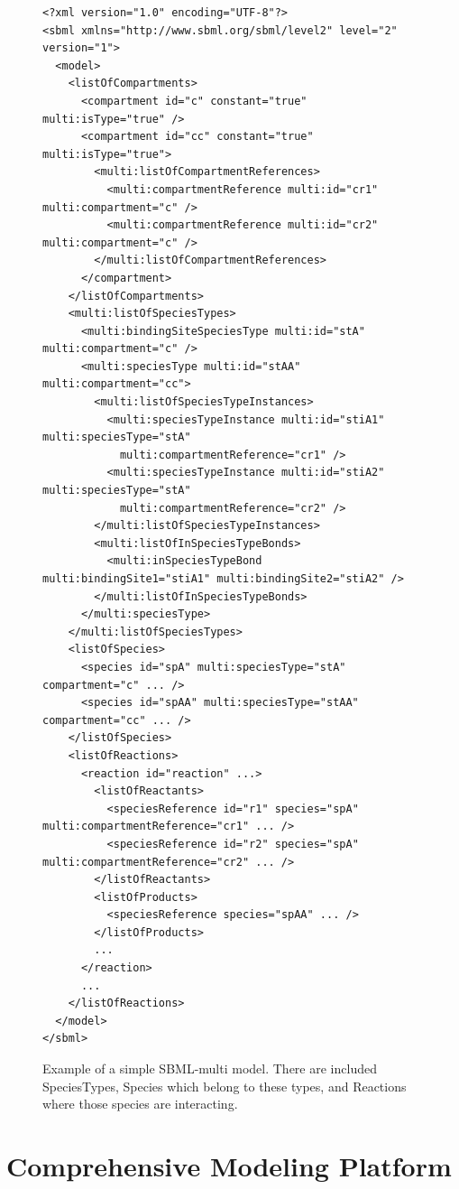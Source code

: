 \documentclass[12pt]{fithesis2}
\begin{document}
\begin{figure}[!h]
\lstset{language=XML}
\begin{lstlisting}[basicstyle=\tiny, frame=single]
<?xml version="1.0" encoding="UTF-8"?>
<sbml xmlns="http://www.sbml.org/sbml/level2" level="2" version="1">
  <model>
    <listOfCompartments>
      <compartment id="c" constant="true" multi:isType="true" />
      <compartment id="cc" constant="true" multi:isType="true">
        <multi:listOfCompartmentReferences>
          <multi:compartmentReference multi:id="cr1" multi:compartment="c" />
          <multi:compartmentReference multi:id="cr2" multi:compartment="c" />
        </multi:listOfCompartmentReferences>
      </compartment>
    </listOfCompartments>
    <multi:listOfSpeciesTypes>
      <multi:bindingSiteSpeciesType multi:id="stA" multi:compartment="c" />
      <multi:speciesType multi:id="stAA" multi:compartment="cc">
        <multi:listOfSpeciesTypeInstances>
          <multi:speciesTypeInstance multi:id="stiA1" multi:speciesType="stA"
            multi:compartmentReference="cr1" />
          <multi:speciesTypeInstance multi:id="stiA2" multi:speciesType="stA"
            multi:compartmentReference="cr2" />
        </multi:listOfSpeciesTypeInstances>
        <multi:listOfInSpeciesTypeBonds>
          <multi:inSpeciesTypeBond multi:bindingSite1="stiA1" multi:bindingSite2="stiA2" />
        </multi:listOfInSpeciesTypeBonds>
      </multi:speciesType>
    </multi:listOfSpeciesTypes>
    <listOfSpecies>
      <species id="spA" multi:speciesType="stA" compartment="c" ... />
      <species id="spAA" multi:speciesType="stAA" compartment="cc" ... />
    </listOfSpecies>
    <listOfReactions>
      <reaction id="reaction" ...>
        <listOfReactants>
          <speciesReference id="r1" species="spA" multi:compartmentReference="cr1" ... />
          <speciesReference id="r2" species="spA" multi:compartmentReference="cr2" ... />
        </listOfReactants>
        <listOfProducts>
          <speciesReference species="spAA" ... />
        </listOfProducts>
        ...
      </reaction>
      ...
    </listOfReactions>
  </model>
</sbml>
\end{lstlisting}
\caption{Example of a simple SBML-multi model. There are included SpeciesTypes, Species which belong to these types, and Reactions where those species are interacting.}\label{SBML_example}
\end{figure}

\section{Comprehensive Modeling Platform}
\label{cmp}
\end{document}
